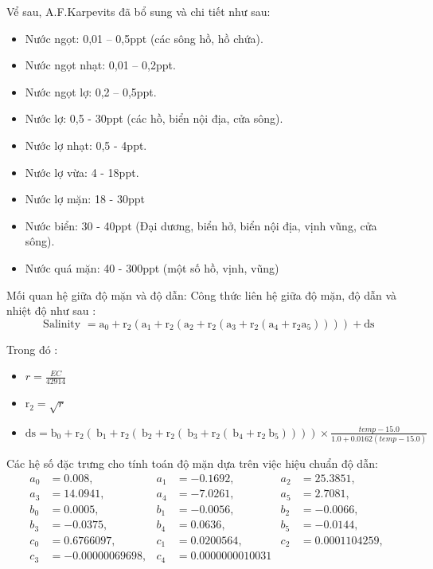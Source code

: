 \documentclass{article} %
\begin{document}
	Vể sau, A.F.Karpevits đã bổ sung và chi tiết như sau:
	\begin{itemize}
		\item Nước ngọt: 0,01 – 0,5ppt (các sông hồ, hồ chứa). 
		\item Nước ngọt nhạt: 0,01 – 0,2ppt. 
		\item Nước ngọt lợ: 0,2 – 0,5ppt. 
		\item Nước lợ: 0,5 - 30ppt (các hồ, biển nội địa, cửa sông).
		\item Nước lợ nhạt: 0,5 - 4ppt.
		\item Nước lợ vừa: 4 - 18ppt. 
		\item Nước lợ mặn: 18 - 30ppt
		\item Nước biển: 30 - 40ppt (Đại dương, biển hở, biển nội địa, vịnh vũng, cửa sông). 
		\item Nước quá mặn: 40 - 300ppt (một số hồ, vịnh, vũng)
	\end{itemize}
	Mối quan hệ giữa độ mặn và độ dẫn:
	Công thức liên hệ giữa độ mặn, độ dẫn và nhiệt độ như sau\cite{islam2023iot} :
	\begin{equation}
		\text { Salinity }=\mathrm{a}_0+\mathrm{r}_2\left(\mathrm{a}_1+\mathrm{r}_2\left(\mathrm{a}_2+\mathrm{r}_2\left(\mathrm{a}_3+\mathrm{r}_2\left(\mathrm{a}_4+\mathrm{r}_2 \mathrm{a}_5\right)\right)\right)\right)+\mathrm{ds}    
	\end{equation}
	
	
	Trong đó : 
	\begin{itemize}
		\item $r=\frac{E C}{42914}$
		\item $\mathrm{r}_2=\sqrt{r}$
		\item $\mathrm{ds}=\mathrm{b}_0+\mathrm{r}_2\left(\mathrm{~b}_1+\mathrm{r}_2\left(\mathrm{~b}_2+\mathrm{r}_2\left(\mathrm{~b}_3+\mathrm{r}_2\left(\mathrm{~b}_4+\mathrm{r}_2 \mathrm{~b}_5\right)\right)\right)\right) \times \frac{t e m p-15.0}{1.0+0.0162(t e m p-15.0)}$
	\end{itemize}
	
	Các hệ số đặc trưng cho tính toán độ mặn dựa trên việc hiệu chuẩn độ dẫn:
	\[
	\begin{aligned}
		a_0 &= 0.008, & a_1 &= -0.1692, & a_2 &= 25.3851, \\
		a_3 &= 14.0941, & a_4 &= -7.0261, & a_5 &= 2.7081, \\
		b_0 &= 0.0005, & b_1 &= -0.0056, & b_2 &= -0.0066, \\
		b_3 &= -0.0375, & b_4 &= 0.0636, & b_5 &= -0.0144, \\
		c_0 &= 0.6766097, & c_1 &= 0.0200564, & c_2 &= 0.0001104259, \\
		c_3 &= -0.00000069698, & c_4 &= 0.0000000010031
	\end{aligned}
	\]
\end{document}
